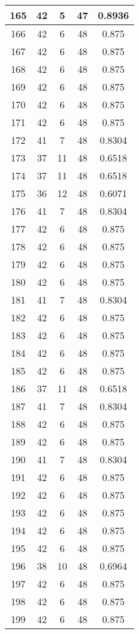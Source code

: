 \documentclass[letterpaper, 12pt]{article}
\begin{document}
\begin{longtable}{|c|c|c|c|c|}
\hline
165 & 42 & 5 & 47 & 0.8936 \\
\hline
166 & 42 & 6 & 48 & 0.875 \\
\hline
167 & 42 & 6 & 48 & 0.875 \\
\hline
168 & 42 & 6 & 48 & 0.875 \\
\hline
169 & 42 & 6 & 48 & 0.875 \\
\hline
170 & 42 & 6 & 48 & 0.875 \\
\hline
171 & 42 & 6 & 48 & 0.875 \\
\hline
172 & 41 & 7 & 48 & 0.8304 \\
\hline
173 & 37 & 11 & 48 & 0.6518 \\
\hline
174 & 37 & 11 & 48 & 0.6518 \\
\hline
175 & 36 & 12 & 48 & 0.6071 \\
\hline
176 & 41 & 7 & 48 & 0.8304 \\
\hline
177 & 42 & 6 & 48 & 0.875 \\
\hline
178 & 42 & 6 & 48 & 0.875 \\
\hline
179 & 42 & 6 & 48 & 0.875 \\
\hline
180 & 42 & 6 & 48 & 0.875 \\
\hline
181 & 41 & 7 & 48 & 0.8304 \\
\hline
182 & 42 & 6 & 48 & 0.875 \\
\hline
183 & 42 & 6 & 48 & 0.875 \\
\hline
184 & 42 & 6 & 48 & 0.875 \\
\hline
185 & 42 & 6 & 48 & 0.875 \\
\hline
186 & 37 & 11 & 48 & 0.6518 \\
\hline
187 & 41 & 7 & 48 & 0.8304 \\
\hline
188 & 42 & 6 & 48 & 0.875 \\
\hline
189 & 42 & 6 & 48 & 0.875 \\
\hline
190 & 41 & 7 & 48 & 0.8304 \\
\hline
191 & 42 & 6 & 48 & 0.875 \\
\hline
192 & 42 & 6 & 48 & 0.875 \\
\hline
193 & 42 & 6 & 48 & 0.875 \\
\hline
194 & 42 & 6 & 48 & 0.875 \\
\hline
195 & 42 & 6 & 48 & 0.875 \\
\hline
196 & 38 & 10 & 48 & 0.6964 \\
\hline
197 & 42 & 6 & 48 & 0.875 \\
\hline
198 & 42 & 6 & 48 & 0.875 \\
\hline
199 & 42 & 6 & 48 & 0.875 \\
\hline
\end{longtable}
\end{document}
